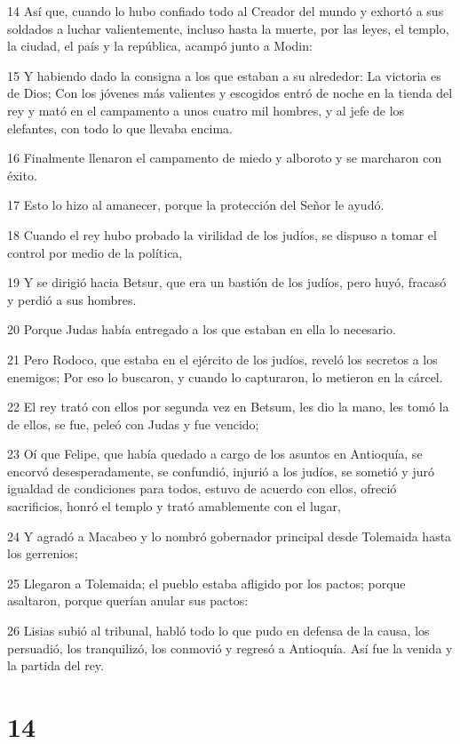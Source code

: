 \par 14 Así que, cuando lo hubo confiado todo al Creador del mundo y exhortó a sus soldados a luchar valientemente, incluso hasta la muerte, por las leyes, el templo, la ciudad, el país y la república, acampó junto a Modin:
\par 15 Y habiendo dado la consigna a los que estaban a su alrededor: La victoria es de Dios; Con los jóvenes más valientes y escogidos entró de noche en la tienda del rey y mató en el campamento a unos cuatro mil hombres, y al jefe de los elefantes, con todo lo que llevaba encima.
\par 16 Finalmente llenaron el campamento de miedo y alboroto y se marcharon con éxito.
\par 17 Esto lo hizo al amanecer, porque la protección del Señor le ayudó.
\par 18 Cuando el rey hubo probado la virilidad de los judíos, se dispuso a tomar el control por medio de la política,
\par 19 Y se dirigió hacia Betsur, que era un bastión de los judíos, pero huyó, fracasó y perdió a sus hombres.
\par 20 Porque Judas había entregado a los que estaban en ella lo necesario.
\par 21 Pero Rodoco, que estaba en el ejército de los judíos, reveló los secretos a los enemigos; Por eso lo buscaron, y cuando lo capturaron, lo metieron en la cárcel.
\par 22 El rey trató con ellos por segunda vez en Betsum, les dio la mano, les tomó la de ellos, se fue, peleó con Judas y fue vencido;
\par 23 Oí que Felipe, que había quedado a cargo de los asuntos en Antioquía, se encorvó desesperadamente, se confundió, injurió a los judíos, se sometió y juró igualdad de condiciones para todos, estuvo de acuerdo con ellos, ofreció sacrificios, honró el templo y trató amablemente con el lugar,
\par 24 Y agradó a Macabeo y lo nombró gobernador principal desde Tolemaida hasta los gerrenios;
\par 25 Llegaron a Tolemaida; el pueblo estaba afligido por los pactos; porque asaltaron, porque querían anular sus pactos:
\par 26 Lisias subió al tribunal, habló todo lo que pudo en defensa de la causa, los persuadió, los tranquilizó, los conmovió y regresó a Antioquía. Así fue la venida y la partida del rey.

\chapter{14}

